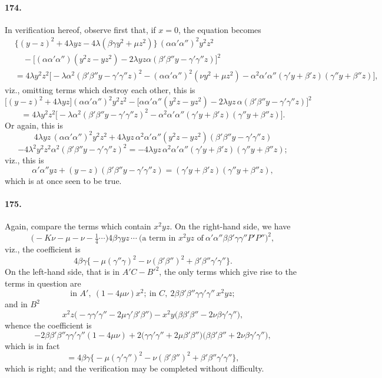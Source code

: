 \documentclass[11pt,a4paper]{article}
\begin{document}
\paragraph{174.}
In verification hereof, observe first that, if $x = 0$, the equation becomes
\[
\begin{aligned}
& \bigl\{(y - z)^2 + 4\lambda yz - 4\lambda(\beta\gamma y^2 + \mu z^2)\bigr\}\,(\alpha\alpha'\alpha'')^2 y^2 z^2 \\
& \quad - \bigl[(\alpha\alpha'\alpha'')(y^2 z - y z^2) - 2\lambda yz \alpha(\beta'\beta'' y - \gamma'\gamma'' z)\bigr]^2 \\
& = 4\lambda y^2 z^2 \bigl[-\lambda \alpha^2 (\beta'\beta'' y - \gamma'\gamma'' z)^2 - (\alpha\alpha'\alpha'')^2 (\nu y^2 + \mu z^2)
- \alpha^2\alpha'\alpha''(\gamma' y + \beta' z)(\gamma'' y + \beta'' z)\bigr],
\end{aligned}
\]
viz., omitting terms which destroy each other, this is
\[
\bigl[(y - z)^2 + 4\lambda yz\bigr](\alpha\alpha'\alpha'')^2 y^2 z^2
- \bigl[\alpha\alpha'\alpha''(y^2 z - y z^2) - 2\lambda yz\,\alpha(\beta'\beta'' y - \gamma'\gamma'' z)\bigr]^2
\]
\[
= 4\lambda y^2 z^2 \bigl[-\lambda \alpha^2(\beta'\beta'' y - \gamma'\gamma'' z)^2
- \alpha^2\alpha'\alpha''(\gamma' y + \beta' z)(\gamma'' y + \beta'' z)\bigr].
\]
Or again, this is
\[
4\lambda yz\,(\alpha\alpha'\alpha'')^2 y^2 z^2 + 4\lambda yz\,\alpha^2\alpha'\alpha''(y^2 z - y z^2)(\beta'\beta'' y - \gamma'\gamma'' z)
\]
\[
- 4\lambda^2 y^2 z^2 \alpha^2(\beta'\beta'' y - \gamma'\gamma'' z)^2
= -4\lambda y z\,\alpha^2\alpha'\alpha''(\gamma' y + \beta' z)(\gamma'' y + \beta'' z);
\]
viz., this is
\[
\alpha'\alpha'' y z + (y - z)(\beta'\beta'' y - \gamma'\gamma'' z)
= (\gamma' y + \beta' z)(\gamma'' y + \beta'' z),
\]
which is at once seen to be true.

\paragraph{175.}
Again, compare the terms which contain $x^2 y z$. On the right-hand side,
we have
\[
\bigl(-K\nu - \mu - \nu - \tfrac{1}{4}\dotsb\bigr) 4\beta\gamma y z\,
\dotsb\ \text{(a term in $x^2 yz$ of}\
\alpha'\alpha''\beta\beta'\gamma\gamma'' P'P'')^2,
\]
viz., the coefficient is
\[
4\beta\gamma\bigl\{-\mu(\gamma''\gamma)^2 - \nu(\beta'\beta'')^2
+ \beta'\beta''\gamma'\gamma''\bigr\}.
\]
On the left-hand side, that is in $A'C - B'^2$, the only terms which give
rise to the terms in question are
\[
\text{in } A',\ (1 - 4\mu\nu)x^2;\ \text{in } C,\ 2\beta\beta'\beta''\gamma\gamma'\gamma''\, x^2 y z;
\]
and in $B^2$
\[
x^2 z \bigl(-\gamma\gamma'\gamma'' - 2\mu\gamma'\beta'\beta''\bigr)
- x^2 y\bigl(\beta\beta'\beta'' - 2\nu\beta\gamma'\gamma''\bigr),
\]
whence the coefficient is
\[
-2\beta\beta'\beta''\gamma\gamma'\gamma''(1 - 4\mu\nu)
+ 2\bigl(\gamma\gamma'\gamma'' + 2\mu\beta'\beta''\bigr)\bigl(\beta\beta'\beta'' + 2\nu\beta\gamma'\gamma''\bigr),
\]
which is in fact
\[
= 4\beta\gamma\bigl\{-\mu(\gamma'\gamma'')^2 - \nu(\beta'\beta'')^2
+ \beta'\beta''\gamma'\gamma''\bigr\},
\]
which is right; and the verification may be completed without difficulty.
\end{document}
